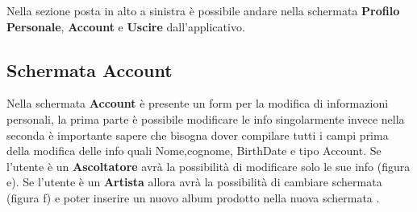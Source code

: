 \documentclass[11pt]{article}
\begin{document}
	\begin{figure}[h]
		\centering
	\end{figure}
	Nella sezione posta in alto a sinistra è possibile andare nella schermata \textbf{Profilo Personale}, \textbf{Account} e \textbf{Uscire} dall'applicativo.

	\clearpage
	\subsection{Schermata Account}

	Nella schermata \textbf{Account} è presente un form per la modifica di informazioni personali, la prima parte è possibile modificare le info singolarmente 
	invece nella seconda è importante sapere che bisogna dover compilare tutti i campi prima della modifica delle info quali Nome,cognome, BirthDate e tipo Account. 
	Se l'utente è un \textbf{Ascoltatore} avrà la possibilità di modificare solo le sue info (figura e).
	Se l'utente è un \textbf{Artista} allora avrà la possibilità di cambiare schermata (figura f) e poter inserire un nuovo album prodotto nella nuova schermata .
	
\end{document}
